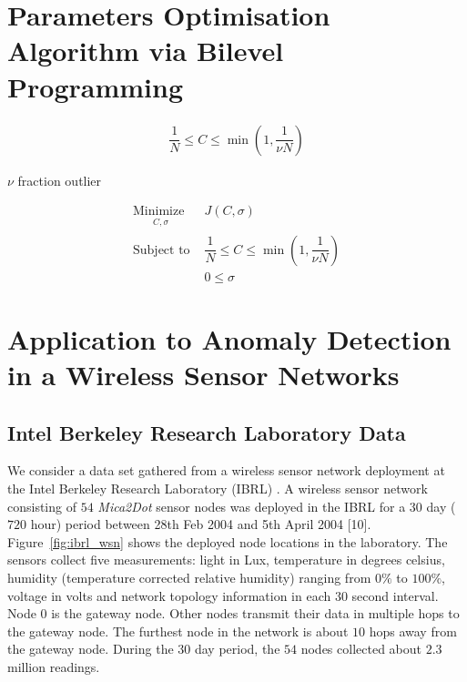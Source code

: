 \documentclass[3p,times]{elsarticle}
\begin{document}
\section{Parameters Optimisation Algorithm via Bilevel Programming}

\cite{scholkopf2001estimating}

\cite{theissler2013autonomously}

\begin{align}
\dfrac{1}{N} \le C \le \min \left( 1, \dfrac{1}{\nu N} \right)
\end{align}

$\nu$ fraction outlier

\begin{subequations}
\begin{align}
\underset{
	\begin{array}{c}
		 C, \sigma
	\end{array}}{\text{Minimize }} & J\left( C, \sigma \right)\\
\text{Subject to } & \dfrac{1}{N} \le C \le \min \left( 1, \dfrac{1}{\nu N} \right) \\
& 0 \le \sigma
\end{align}
\end{subequations}

\section{Application to Anomaly Detection in a Wireless Sensor Networks}

\subsection{Intel Berkeley Research Laboratory Data}

We consider a data set gathered from a wireless sensor network deployment at the Intel Berkeley Research Laboratory (IBRL) \cite{Buonadonna2005}. A wireless sensor network consisting of $54$ \emph{Mica2Dot} sensor nodes was deployed in the IBRL for a $30$ day ($720$ hour) period between 28th Feb 2004 and 5th April 2004 [10]. Figure~\ref{fig:ibrl_wsn} shows the deployed node locations in the laboratory. The sensors collect five measurements: light in Lux, temperature in degrees celsius, humidity (temperature corrected relative humidity) ranging from $0\%$ to $100\%$, voltage in volts and network topology information in each $30$ second interval. Node $0$ is the gateway node. Other nodes transmit their data in multiple hops to the gateway node. The furthest node in the network is about $10$ hops away from the gateway node. During the $30$ day period, the $54$ nodes collected about $2.3$ million readings.
\end{document}
